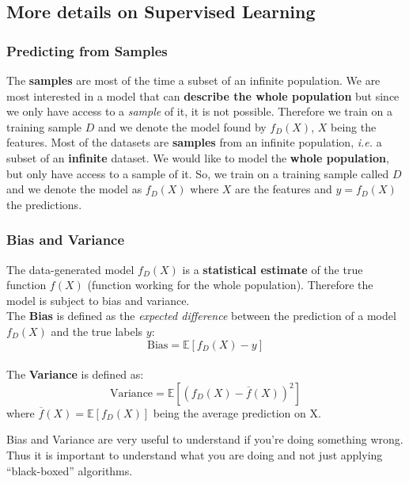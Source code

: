 \subsection{More details on Supervised Learning}

\subsubsection{Predicting from Samples}

The \textbf{samples} are most of the time a subset of an infinite population. We are most interested in a model that can {\bf describe the whole population} but since we only have access to a \emph{sample} of it, it is not possible. Therefore we train on a training sample $D$ and we denote the model found by $f_D(X)$, $X$ being the features.
Most of the datasets are \textbf{samples} from an infinite population, \emph{i.e.} a subset of an \textbf{infinite} dataset. We would like to model the \textbf{whole population}, but only have access to a sample of it. So, we train on a training sample called $D$ and we denote the model as $f_D(X)$ where $X$ are the features and $y=f_D(X)$ the predictions.

\subsubsection{Bias and Variance}

The data-generated model $f_D(X)$ is a \textbf{statistical estimate} of the true function $f(X)$ (function working for the whole population). Therefore the model is subject to bias and variance. 
\\
The \textbf{Bias} is defined as the \emph{expected difference} between the prediction of a model $f_D(X)$ and the true labels $y$:
\[
 \textrm{Bias} = \mathbb{E}\left[ f_D(X)-y\right]
\]
\\
The \textbf{Variance} is defined as:
\[
 \textrm{Variance} = \mathbb{E}\left[\left(f_D(X) - \overline{f}(X)\right)^2\right]
\]
where $\overline{f}(X) = \mathbb{E}\left[f_D(X)\right]$ being the average prediction on X.

Bias and Variance are very useful to understand if you're doing something wrong. Thus it is important to understand what you are doing and not just applying ``black-boxed'' algorithms.

